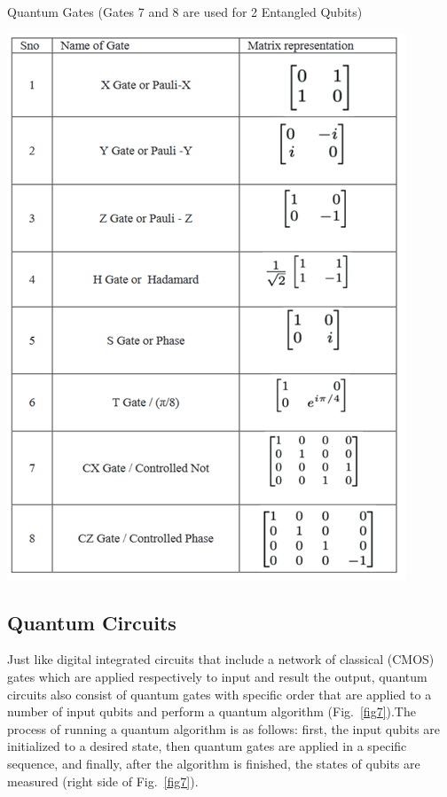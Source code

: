 \documentclass[conference]{IEEEtran}
\begin{document}
\begin{table}[htbp]
	\caption{Quantum Gates \cite{b10} (Gates 7 and 8 are used for 2 Entangled Qubits)}
	\centerline{\includegraphics[scale=0.9]{gates.png}}
	\label{table1}
\end{table}

\subsection{Quantum Circuits}
Just like digital integrated circuits that include a network of classical (CMOS) gates which are applied respectively to input and result the output, quantum circuits also consist of quantum gates with specific order that are applied to a number of input qubits and perform a quantum algorithm (Fig.~\ref{fig7}).The process of running a quantum algorithm is as follows: first, the input qubits are initialized to a desired state, then quantum gates are applied in a specific sequence, and finally, after the algorithm is finished, the states of qubits are measured (right side of Fig.~\ref{fig7}).
\end{document}
